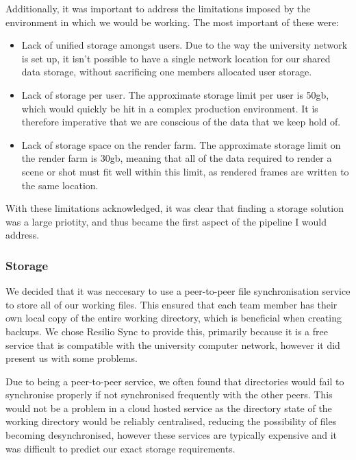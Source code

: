\documentclass[11pt]{article}
\begin{document}

Additionally, it was important to address the limitations imposed by the environment in which we would be working. The most important of these were:

\begin{itemize}

\item Lack of unified storage amongst users. Due to the way the university network is set up, it isn't possible to have a single network location for our shared data storage, without sacrificing one members allocated user storage.

\item Lack of storage per user. The approximate storage limit per user is 50gb, which would quickly be hit in a complex production environment. It is therefore imperative that we are conscious of the data that we keep hold of.

\item Lack of storage space on the render farm. The approximate storage limit on the render farm is 30gb, meaning that all of the data required to render a scene or shot must fit well within this limit, as rendered frames are written to the same location.

\end{itemize}

With these limitations acknowledged, it was clear that finding a storage solution was a large priotity, and thus became the first aspect of the pipeline I would address.

\subsubsection{Storage}

We decided that it was neccesary to use a peer-to-peer file synchronisation service to store all of our working files. This ensured that each team member has their own local copy of the entire working directory, which is beneficial when creating backups. We chose Resilio Sync to provide this, primarily because it is a free service that is compatible with the university computer network, however it did present us with some problems.

Due to being a peer-to-peer service, we often found that directories would fail to synchronise properly if not synchronised frequently with the other peers. This would not be a problem in a cloud hosted service as the directory state of the working directory would be reliably centralised, reducing the possibility of files becoming desynchronised, however these services are typically expensive and it was difficult to predict our exact storage requirements.
\end{document}
